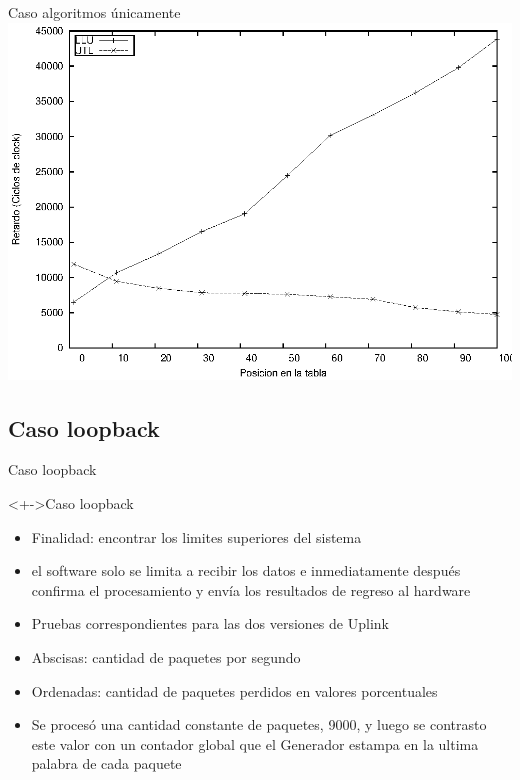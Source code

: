 \documentclass[xcolor=dvipsnames]{beamer}
\begin{document}
\begin{frame}{Caso algoritmos únicamente} 
\center	
\includegraphics[scale=0.70]{figures/llu-utlsof.eps} 
\end{frame}

\subsection{Caso loopback}

\begin{frame}{Caso loopback} 
\begin{block}<+->{Caso loopback}   
    \begin{itemize}
      \scriptsize
     	\item Finalidad: encontrar los limites superiores del sistema
     	\item el software solo se limita a recibir los datos e inmediatamente después confirma el procesamiento y envía los resultados de regreso al hardware
	\item Pruebas correspondientes para las dos versiones de Uplink
	\item Abscisas: cantidad de paquetes por segundo
	\item Ordenadas: cantidad de paquetes perdidos en valores porcentuales
	\item Se procesó una cantidad constante de paquetes, 9000, y luego se contrasto este valor con un contador global que el Generador estampa en la ultima palabra de cada paquete
    \end{itemize}
  \end{block}
\end{frame}
\end{document}
